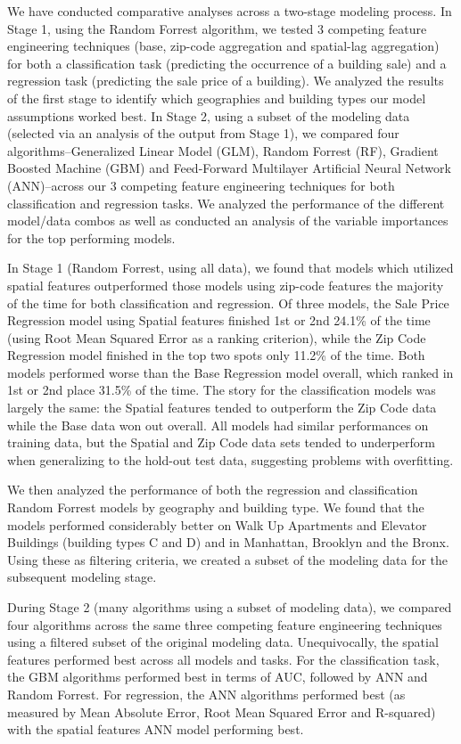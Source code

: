 \documentclass[12pt,]{article}
\begin{document}
We have conducted comparative analyses across a two-stage modeling
process. In Stage 1, using the Random Forrest algorithm, we tested 3
competing feature engineering techniques (base, zip-code aggregation and
spatial-lag aggregation) for both a classification task (predicting the
occurrence of a building sale) and a regression task (predicting the
sale price of a building). We analyzed the results of the first stage to
identify which geographies and building types our model assumptions
worked best. In Stage 2, using a subset of the modeling data (selected
via an analysis of the output from Stage 1), we compared four
algorithms--Generalized Linear Model (GLM), Random Forrest (RF),
Gradient Boosted Machine (GBM) and Feed-Forward Multilayer Artificial
Neural Network (ANN)--across our 3 competing feature engineering
techniques for both classification and regression tasks. We analyzed the
performance of the different model/data combos as well as conducted an
analysis of the variable importances for the top performing models.

In Stage 1 (Random Forrest, using all data), we found that models which
utilized spatial features outperformed those models using zip-code
features the majority of the time for both classification and
regression. Of three models, the Sale Price Regression model using
Spatial features finished 1st or 2nd 24.1\% of the time (using Root Mean
Squared Error as a ranking criterion), while the Zip Code Regression
model finished in the top two spots only 11.2\% of the time. Both models
performed worse than the Base Regression model overall, which ranked in
1st or 2nd place 31.5\% of the time. The story for the classification
models was largely the same: the Spatial features tended to outperform
the Zip Code data while the Base data won out overall. All models had
similar performances on training data, but the Spatial and Zip Code data
sets tended to underperform when generalizing to the hold-out test data,
suggesting problems with overfitting.

We then analyzed the performance of both the regression and
classification Random Forrest models by geography and building type. We
found that the models performed considerably better on Walk Up
Apartments and Elevator Buildings (building types C and D) and in
Manhattan, Brooklyn and the Bronx. Using these as filtering criteria, we
created a subset of the modeling data for the subsequent modeling stage.

During Stage 2 (many algorithms using a subset of modeling data), we
compared four algorithms across the same three competing feature
engineering techniques using a filtered subset of the original modeling
data. Unequivocally, the spatial features performed best across all
models and tasks. For the classification task, the GBM algorithms
performed best in terms of AUC, followed by ANN and Random Forrest. For
regression, the ANN algorithms performed best (as measured by Mean
Absolute Error, Root Mean Squared Error and R-squared) with the spatial
features ANN model performing best.
\end{document}
